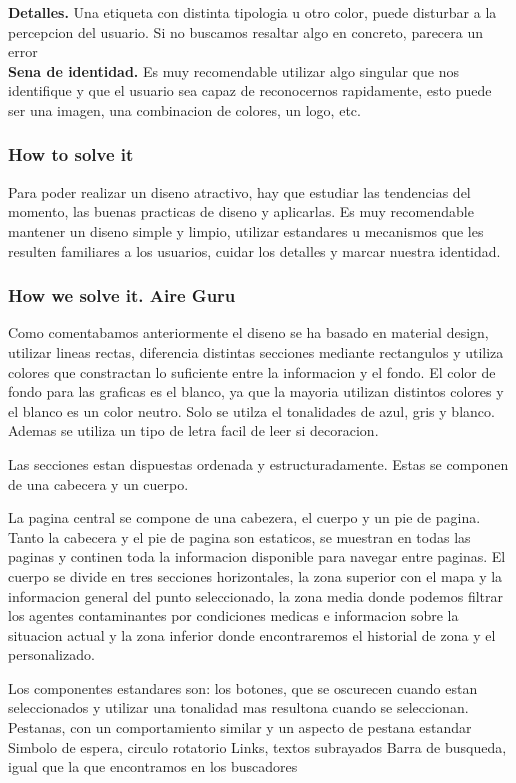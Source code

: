\textbf{Detalles.} Una etiqueta con distinta tipologia u otro color, puede disturbar a la percepcion del usuario. Si no 
buscamos resaltar algo en concreto, parecera un error \\

\textbf{Sena de identidad.} Es muy recomendable utilizar algo singular que nos identifique y que el usuario sea capaz 
de reconocernos rapidamente, esto puede ser una imagen, una combinacion de colores, un logo, etc.

\subsubsection{How to solve it} 
Para poder realizar un diseno atractivo, hay que estudiar las tendencias del momento, las buenas practicas de diseno y aplicarlas.
Es muy recomendable mantener un diseno simple y limpio, utilizar estandares u mecanismos que les resulten familiares a los usuarios,
cuidar los detalles y marcar nuestra identidad.


\subsubsection{How we solve it. Aire Guru} 
Como comentabamos anteriormente el diseno se ha basado en material design, utilizar lineas rectas, diferencia
distintas secciones mediante rectangulos y utiliza colores que constractan lo suficiente entre la informacion y el fondo.
El color de fondo para las graficas es el blanco, ya que la mayoria utilizan distintos colores y el blanco es un color 
neutro. Solo se utilza el tonalidades de azul, gris y blanco. Ademas se utiliza un tipo de letra facil de leer si decoracion.

Las secciones estan dispuestas ordenada y estructuradamente. Estas  se componen de una cabecera y un cuerpo. 

La pagina central se compone de una cabezera, el cuerpo y un pie de pagina. Tanto la cabecera y el pie de pagina son estaticos,
se muestran en todas las paginas y continen toda la informacion disponible para navegar entre paginas.
El cuerpo se divide en tres secciones horizontales, la zona superior con el mapa y la informacion general del punto seleccionado,
la zona media donde podemos filtrar los agentes contaminantes por condiciones medicas e informacion sobre la situacion actual y la 
zona inferior donde encontraremos el historial de zona y el personalizado.

Los componentes estandares son:
los botones, que se oscurecen cuando estan seleccionados y utilizar una tonalidad mas resultona cuando se seleccionan.
Pestanas, con un comportamiento similar y un aspecto de pestana estandar
Simbolo de espera, circulo rotatorio
Links, textos subrayados
Barra de busqueda, igual que la que encontramos en los buscadores


